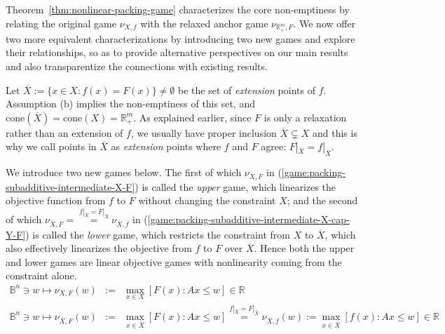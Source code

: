 \documentclass[11pt]{article}\usepackage[]{graphicx}\usepackage[]{xcolor}
\begin{document}
Theorem~\ref{thm:nonlinear-packing-game} characterizes the core non-emptiness by relating the original game 
$\nu_{X, f}$ with the relaxed anchor game $\nu_{\mathbb{R}^m_{+}, F}$. We now offer two more equivalent characterizations by introducing two new games and explore their relationships, so as to provide alternative perspectives on our main results and also transparentize the connections with existing results. 

Let $\overline{X}:=\{x\in X: f(x)=F(x)\}\ne\emptyset$ be the set of \emph{extension} points of $f$. Assumption (b) implies the non-emptiness of this set, and $\text{cone}(\overline{X})=\text{cone}(X)=\mathbb{R}^m_{+}$. As explained earlier, since $F$ is only a relaxation rather than an extension of $f$, we usually have proper inclusion $\overline{X}\subsetneq X$ and this is why we call points in $\overline{X}$ as \emph{extension} points where $f$ and $F$ agree: $F|_{\overline{X}}=f|_{\overline{X}}$. 

We introduce two new games below. The first of which $\nu_{X, F}$ in (\ref{game:packing-subadditive-intermediate-X-F}) is called the \emph{upper} game, which linearizes the objective function from $f$ to $F$ without changing the constraint $X$; and the second of which $\nu_{\overline{X}, F}=\overset{f|_{\overline{X}}=F|_{\overline{X}}}{=}\nu_{\overline{X}, f}$ in (\ref{game:packing-subadditive-intermediate-X-cap-Y-F}) is called the \emph{lower} game, which restricts the constraint from $X$ to $\overline{X}$, which also effectively linearizes the objective from $f$ to $F$ over $\overline{X}$. Hence both the upper and lower games are linear objective games with nonlinearity coming from the constraint alone. 
\begin{eqnarray}
\label{game:packing-subadditive-intermediate-X-F}
\mathbb{B}^n\ni w\mapsto\nu_{X, F}(w)&:=&\max\limits_{x\in X} \left[F(x): Ax\le w\right]\in \mathbb{R}\\
\label{game:packing-subadditive-intermediate-X-cap-Y-F}
\mathbb{B}^n\ni w\mapsto \nu_{\overline{X}, F}(w)&:=&\max\limits_{x\in \overline{X}} \left[F(x): Ax\le w\right]\overset{f|_{\overline{X}}=F|_{\overline{X}}}{=}\nu_{\overline{X}, f}(w):=\max\limits_{x\in \overline{X}} \left[f(x): Ax\le w\right]\in \mathbb{R}
\end{eqnarray}
\end{document}
